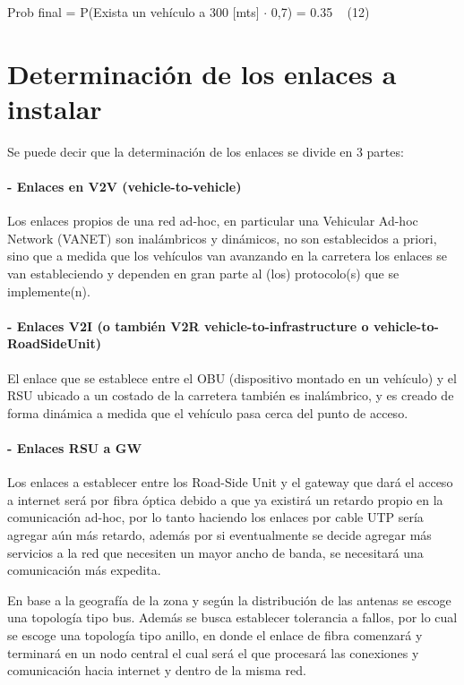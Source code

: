 \documentclass[12pt]{article}
\begin{document}
Prob final = P(Exista un vehículo a 300 [mts] $\cdot$ 0,7) = 0.35 \qquad \ \qquad 
\footnotesize (12) \normalsize

\newpage
\section{Determinación de los enlaces a instalar}
Se puede decir que la determinación de los enlaces se divide en 3 partes:

\paragraph{- Enlaces en V2V (vehicle-to-vehicle)\\}
Los enlaces propios de una red ad-hoc, en particular una Vehicular Ad-hoc Network (VANET) son 
inalámbricos y dinámicos, no son 
establecidos a priori, sino que a medida que los vehículos van avanzando en la carretera los enlaces se 
van estableciendo y dependen en gran parte al (los) protocolo(s) que se implemente(n).\\

\paragraph{- Enlaces V2I (o también V2R vehicle-to-infrastructure o vehicle-to-RoadSideUnit)\\}
El enlace que se establece entre el OBU (dispositivo montado en un vehículo) y el RSU ubicado a un 
costado de la carretera también es inalámbrico, y es creado de forma dinámica a medida que el vehículo 
pasa cerca del punto de acceso.\\

\paragraph{- Enlaces RSU a GW\\}
Los enlaces a establecer entre los Road-Side Unit y el gateway que dará el acceso a internet será por 
fibra óptica debido a que ya existirá un retardo propio en la comunicación ad-hoc, por lo tanto haciendo
los enlaces por cable UTP sería agregar aún más retardo, además por si eventualmente se decide agregar 
más servicios a la red que necesiten un mayor ancho de banda, se necesitará una comunicación más 
expedita.

En base a la geografía de la zona y según la distribución de las antenas se escoge una topología tipo 
bus. Además se busca establecer tolerancia a fallos, por lo cual se escoge una topología tipo anillo, 
en donde el enlace de fibra comenzará y terminará en un nodo central el cual será el que procesará las 
conexiones y comunicación hacia internet y dentro de la misma red.
\end{document}
